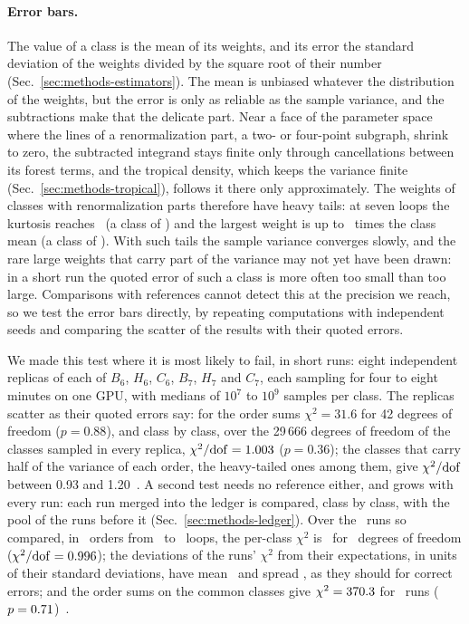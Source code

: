 \paragraph{Error bars.}
The value of a class is the mean of its weights, and its error the standard deviation of the weights divided by the
square root of their number (Sec.~\ref{sec:methods-estimators}). The mean is unbiased whatever the distribution of the
weights, but the error is only as reliable as the sample variance, and the subtractions make that the delicate part.
Near a face of the parameter space where the lines of a renormalization part, a two- or four-point subgraph, shrink to
zero, the subtracted integrand stays finite only through cancellations between its forest terms, and the tropical
density, which keeps the variance finite (Sec.~\ref{sec:methods-tropical}), follows it there only approximately. The
weights of classes with renormalization parts therefore have heavy tails: at seven loops the kurtosis reaches
\kurtmaxseven\ (a class of \kurtmaxsevenorder) and the largest weight is up to \wmaxmaxseven\ times the class mean (a
class of \wmaxmaxsevenorder). With such tails the sample variance converges slowly, and the rare large weights that
carry part of the variance may not yet have been drawn: in a short run the quoted error of such a class is more often
too small than too large. Comparisons with references cannot detect this at the precision we reach, so we test the
error bars directly, by repeating computations with independent seeds and comparing the scatter of the results with
their quoted errors.

We made this test where it is most likely to fail, in short runs: eight independent replicas of each of $B_6$, $H_6$,
$C_6$, $B_7$, $H_7$ and $C_7$, each sampling for four to eight minutes on one GPU, with medians of $10^{7}$ to $10^{9}$
samples per class. The replicas scatter as their quoted errors say: for the order sums $\chi^2=31.6$ for 42 degrees of
freedom ($p=0.88$), and class by class, over the 29\,666 degrees of freedom of the classes sampled in every replica,
$\chi^2/{\rm dof}=1.003$ ($p=0.36$); the classes that carry half of the variance of each order, the heavy-tailed ones
among them, give $\chi^2/{\rm dof}$ between 0.93 and 1.20~. A second test needs no reference either, and
grows with every run: each run merged into the ledger is compared, class by class, with the pool of the runs before
it (Sec.~\ref{sec:methods-ledger}). Over the \mergeruns\ runs so compared, in \mergeorders\ orders from \mergeLmin\
to \mergeLmax\ loops, the per-class $\chi^2$ is \mergechisq\ for \mergedof\ degrees of freedom
($\chi^2/{\rm dof}=0.996$); the deviations of the runs' $\chi^2$ from their expectations, in units of their
standard deviations, have mean \mergezmean\ and spread \mergezsd, as they should for correct errors; and the order
sums on the common classes give $\chi^2=370.3$ for \mergesumn\ runs
($p=0.71$)~\checks{N5,S2}.

